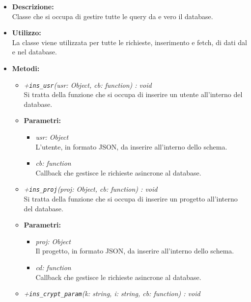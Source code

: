         \begin{itemize}
          \item \textbf{Descrizione: }\\
          Classe che si occupa di gestire tutte le query da e vero il database.
          \item \textbf{Utilizzo: }\\
          La classe viene utilizzata per tutte le richieste, inserimento e fetch, di dati dal e nel database.
          \item \textbf{Metodi: }\\
          \begin{itemize}
            \item \emph{+\texttt{ins\_usr}(usr: Object, cb: function) : void}\\
            Si tratta della funzione che si occupa di inserire un utente all'interno del database.\\
            \item \textbf{Parametri: }\\
            \begin{itemize}
              \item \emph{usr: Object}\\
              L'utente, in formato JSON, da inserire all'interno dello schema.
              \item \emph{cb: function}\\
              Callback che gestisce le richieste asincrone al database.
            \end{itemize}
            \item \emph{+\texttt{ins\_proj}(proj: Object, cb: function) : void}\\
            Si tratta della funzione che si occupa di inserire un progetto all'interno del database.\\
            \item \textbf{Parametri: }\\
            \begin{itemize}
              \item \emph{proj: Object}\\
              Il progetto, in formato JSON, da inserire all'interno dello schema.
              \item \emph{cd: function}\\
              Callback che gestisce le richieste asincrone al database.
            \end{itemize}
            \item \emph{+\texttt{ins\_crypt\_param}(k: string, i: string, cb: function) : void}\\

\end{itemize}
\end{itemize}
